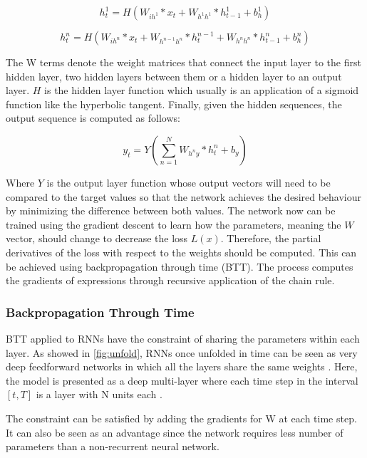 \begin{equation} \label{eq:hidden1}
h_t^1= H( W_{ih^1} * x_t + W_{h^1 h^1}*h^1_{t-1} + b^1_h)
\end{equation}

\begin{equation} \label{eq:hidden}
h_t^n= H(W_{ih^n} * x_t + W_{h^{n-1}  h^n} * h^{n-1}_t +W_{h^n h^n} * h^n_{t-1}+ b^n_h)
\end{equation}

The W terms denote the weight matrices that connect the input layer to the first hidden layer, two hidden layers between them or a hidden layer to an output layer. $H$ is the hidden layer function which usually is an application of a sigmoid function like the hyperbolic tangent. Finally, given the hidden sequences, the output sequence is computed as follows:

\begin{equation} \label{eq:output}
y_t=Y(\sum_{n=1}^{N} W_{h^{n}y} * h^n_t + b_y)
\end{equation}

Where $Y$ is the output layer function whose output vectors will need to be compared to the target values so that the network achieves the desired behaviour by minimizing the difference between both values.
The network now can be trained using the gradient descent to learn how the parameters, meaning the $W$ vector, should change to decrease the loss  $L(x)$. Therefore, the partial derivatives of the loss with respect to the weights should be computed. This can be achieved using backpropagation through time (BTT). The process computes the gradients of expressions through recursive application of the chain rule.

\subsubsection{Backpropagation Through Time}
BTT applied to RNNs have the constraint of sharing the parameters within each layer. As showed in  \ref{fig:unfold}, RNNs once unfolded in time can be seen as very deep feedforward networks in which all the layers share the same weights \cite{lecun2015deep}. Here, the model is presented as a deep multi-layer where each time step in the interval $[t,T]$ is a layer with N units each \cite{pascanu2013difficulty}. 

The constraint can be satisfied by adding the gradients for W at each time step. It can also be seen as an advantage since the network requires less number of parameters than a non-recurrent neural network.

